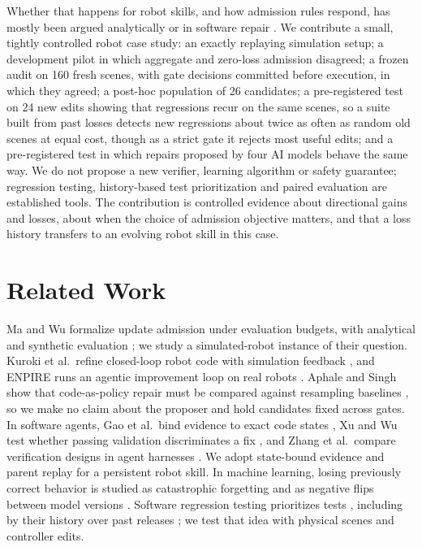 \documentclass[letterpaper]{article} %
\begin{document}
Whether that happens for robot skills, and how admission rules respond, has mostly been argued analytically or in software repair \citep{ma2026validation,gao2026looping}. We contribute a small, tightly controlled robot case study: an exactly replaying simulation setup; a development pilot in which aggregate and zero-loss admission disagreed; a frozen audit on 160 fresh scenes, with gate decisions committed before execution, in which they agreed; a post-hoc population of 26 candidates; a pre-registered test on 24 new edits showing that regressions recur on the same scenes, so a suite built from past losses detects new regressions about twice as often as random old scenes at equal cost, though as a strict gate it rejects most useful edits; and a pre-registered test in which repairs proposed by four AI models behave the same way. We do not propose a new verifier, learning algorithm or safety guarantee; regression testing, history-based test prioritization and paired evaluation are established tools. The contribution is controlled evidence about directional gains and losses, about when the choice of admission objective matters, and that a loss history transfers to an evolving robot skill in this case.

\section{Related Work}
Ma and Wu formalize update admission under evaluation budgets, with analytical and synthetic evaluation \citep{ma2026validation}; we study a simulated-robot instance of their question. Kuroki et al.\ refine closed-loop robot code with simulation feedback \citep{kuroki2026closedloop}, and ENPIRE runs an agentic improvement loop on real robots \citep{xiao2026enpire}. Aphale and Singh show that code-as-policy repair must be compared against resampling baselines \citep{aphale2026selfrepair}, so we make no claim about the proposer and hold candidates fixed across gates. In software agents, Gao et al.\ bind evidence to exact code states \citep{gao2026looping}, Xu and Wu test whether passing validation discriminates a fix \citep{xu2026evidence}, and Zhang et al.\ compare verification designs in agent harnesses \citep{zhang2026verification}. We adopt state-bound evidence and parent replay for a persistent robot skill. In machine learning, losing previously correct behavior is studied as catastrophic forgetting \citep{kirkpatrick2017forgetting} and as negative flips between model versions \citep{yan2021pct}. Software regression testing prioritizes tests \citep{elbaum2002prioritization}, including by their history over past releases \citep{kim2002history}; we test that idea with physical scenes and controller edits.
\end{document}
